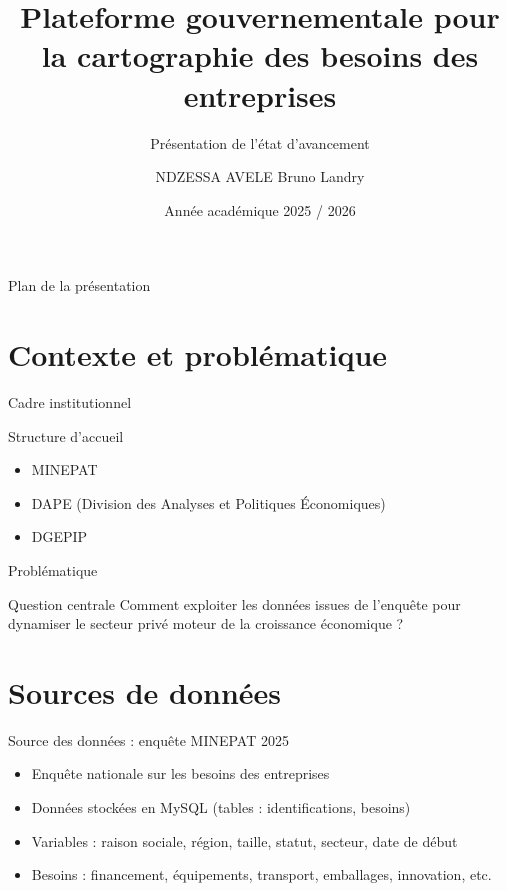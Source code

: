 \documentclass[aspectratio=169, 10pt]{beamer}
\title{Plateforme gouvernementale pour la cartographie des besoins des entreprises}
\subtitle{Présentation de l'état d'avancement}
\author{NDZESSA AVELE Bruno Landry}
\institute{ENSPM — Université de Maroua}
\date{Année académique 2025 / 2026}
\begin{document}
	
	\begin{frame}[plain]
		\titlepage
	\end{frame}
	
	\begin{frame}{Plan de la présentation}
		\tableofcontents[hideallsubsections]
	\end{frame}
	
	\section{Contexte et problématique}
	\begin{frame}{Cadre institutionnel}
		\begin{block}{Structure d'accueil}
			\begin{itemize}
				\item MINEPAT
				\item DAPE (Division des Analyses et Politiques Économiques)
				\item DGEPIP
			\end{itemize}
		\end{block}
	\end{frame}
	
	\begin{frame}{Problématique}
		\begin{exampleblock}{Question centrale}
			Comment exploiter les données issues de l’enquête pour dynamiser le secteur privé moteur de la croissance économique ?
		\end{exampleblock}
	\end{frame}
	
	\section{Sources de données}
	\begin{frame}{Source des données : enquête MINEPAT 2025}
		\begin{itemize}
			\item Enquête nationale sur les besoins des entreprises
			\item Données stockées en MySQL (tables : identifications, besoins)
			\item Variables : raison sociale, région, taille, statut, secteur, date de début
			\item Besoins : financement, équipements, transport, emballages, innovation, etc.
		\end{itemize}
	\end{frame}
	
\end{document}
